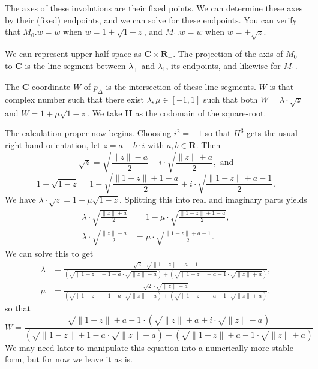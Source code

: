 \documentclass{amsart}
\theoremstyle{plain}
\begin{document}
The axes of these involutions are their fixed points.
We can determine these axes by their (fixed) endpoints,
and we can solve for these endpoints. You can verify
that $M_0.w = w$ when $w = 1 \pm \sqrt{1-z}$, and
$M_1.w = w$ when $w = \pm \sqrt{z}$.

We can represent upper-half-space as $\mathbf{C} \times \mathbf{R_+}$.
The projection of the axis of $M_0$ to $\mathbf{C}$ is
the line segment between $\lambda_+$ and $\lambda_1$, its
endpoints, and likewise for $M_1$. 

The $\mathbf{C}$-coordinate $W$
of $p_\Delta$ is the intersection 
of these line segments. $W$ is that 
complex number such that there exist
$\lambda, \mu \in [-1,1]$ such that 
both $W = \lambda \cdot \sqrt{z}$
and $W = 1 + \mu \sqrt{1-z}$. We take
$\mathbf{H}$ as the codomain of the square-root.

The calculation proper now begins.
Choosing $i^2 = -1$ so that $H^3$
gets the usual right-hand orientation,
let $z = a+b\cdot i$ with $a, b \in \mathbf{R}$.
Then 
\[
\sqrt{z} = \sqrt{\frac{\|z\| - a}{2}} + i \cdot \sqrt{\frac{\|z\| + a}{2}}, \mbox{ and}
\]
\[
1+\sqrt{1-z} = 1 - \sqrt{\frac{\|1-z\| + 1 - a}{2}} + i \cdot \sqrt{\frac{\|1 - z\| + a - 1}{2}}.
\]
We have $\lambda \cdot \sqrt{z} = 1 + \mu \sqrt{1-z}$.
Splitting this into real and imaginary parts yields
\begin{align*}
\lambda \cdot \sqrt{\frac{\|z\| + a}{2}} &= 1 - \mu \cdot \sqrt{\frac{\|1-z\| + 1 - a}{2}},\\
\lambda \cdot \sqrt{\frac{\|z\| - a}{2}} &= \mu \cdot \sqrt{\frac{\|1-z\| + a - 1}{2}}.
\end{align*}
We can solve this to get
\begin{align*}
\lambda &= \frac{\sqrt{2} \cdot \sqrt{\|1-z\| + a-1}}
            {(\sqrt{\|1-z\|+1-a}\cdot \sqrt{\|z\|-a})+(\sqrt{\|1-z\|+a-1}\cdot\sqrt{\|z\|+a})},\\
\mu &= \frac{\sqrt{2} \cdot \sqrt{\|z\| - a}}
            {(\sqrt{\|1-z\|+1-a}\cdot \sqrt{\|z\|-a})+(\sqrt{\|1-z\|+a-1}\cdot\sqrt{\|z\|+a})},
\end{align*}
so that
\begin{equation}
W = \frac{\sqrt{\|1-z\| + a-1}\cdot (\sqrt{\|z\|+a} + i \cdot \sqrt{\|z\|-a})}
            {(\sqrt{\|1-z\|+1-a}\cdot \sqrt{\|z\|-a})+(\sqrt{\|1-z\|+a-1}\cdot\sqrt{\|z\|+a})}
\end{equation}
We may need later to manipulate this 
equation into a numerically more 
stable form, but for now we leave it as is.
\end{document}
